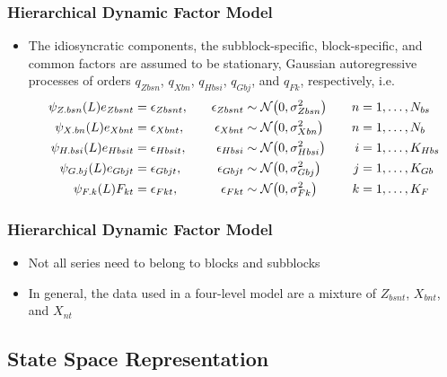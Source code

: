 \documentclass[10pt, compress, notheorems, aspectratio=169]{beamer}
\let\originalleft\left
\let\originalright\right
\renewcommand{\left}{\mathopen{}\mathclose \bgroup \originalleft}
\renewcommand{\right}{\aftergroup \egroup \originalright}
\begin{document}
\begin{frame}
	\frametitle{Hierarchical Dynamic Factor Model}
	\begin{itemize}
		\item The idiosyncratic components, the subblock-specific, block-specific, and common factors are assumed to be stationary, Gaussian autoregressive processes of orders $q_{Zbsn}$, $q_{Xbn}$, $q_{Hbsi}$, $q_{Gbj}$, and $q_{Fk}$, respectively, i.e.
			\begin{alignat*}{3}
				\psi_{Z.bsn} \left( L \right) e_{Zbsnt} &= \epsilon_{Zbsnt}, \quad & \epsilon_{Zbsnt} &\sim \mathcal{N} \left( 0, \sigma^2_{Zbsn} \right) \quad & n &= 1, \ldots, N_{bs} \\
				\psi_{X.bn} \left( L \right) e_{Xbnt} &= \epsilon_{Xbnt}, \quad & \epsilon_{Xbnt} &\sim \mathcal{N} \left( 0, \sigma^2_{Xbn} \right) \quad & n &= 1, \ldots, N_b \\
				\psi_{H.bsi} \left( L \right) e_{Hbsit} &= \epsilon_{Hbsit}, & \epsilon_{Hbsi} &\sim \mathcal{N} \left(0, \sigma^2_{Hbsi} \right) & i &= 1, \ldots, K_{Hbs} \\
				\psi_{G.bj} \left( L \right) e_{Gbjt} &= \epsilon_{Gbjt}, & \epsilon_{Gbjt} &\sim \mathcal{N} \left(0, \sigma^2_{Gbj} \right) & j &= 1, \ldots, K_{Gb} \\
				\psi_{F.k} \left( L \right) F_{kt} &= \epsilon_{Fkt}, & \epsilon_{Fkt} &\sim \mathcal{N} \left(0, \sigma^2_{Fk} \right) & k &= 1, \ldots, K_{F}
			\end{alignat*}
	\end{itemize}
\end{frame}

\begin{frame}
	\frametitle{Hierarchical Dynamic Factor Model}
	\begin{itemize}
		\item Not all series need to belong to blocks and subblocks
		\item In general, the data used in a four-level model are a mixture of $Z_{bsnt}$, $X_{bnt}$, and $X_{nt}$
	\end{itemize}	
\end{frame}

\subsection{State Space Representation}
\end{document}
